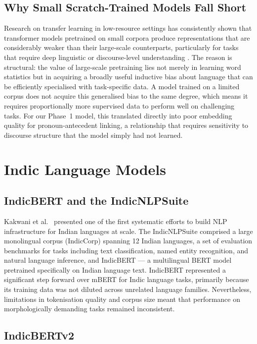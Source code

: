 \documentclass[12pt,a4paper]{report}
\begin{document}
\subsection{Why Small Scratch-Trained Models Fall Short}

Research on transfer learning in low-resource settings has consistently shown that transformer models pretrained on small corpora produce representations that are considerably weaker than their large-scale counterparts, particularly for tasks that require deep linguistic or discourse-level understanding \cite{lauscher2020zero}. The reason is structural: the value of large-scale pretraining lies not merely in learning word statistics but in acquiring a broadly useful inductive bias about language that can be efficiently specialised with task-specific data. A model trained on a limited corpus does not acquire this generalised bias to the same degree, which means it requires proportionally more supervised data to perform well on challenging tasks. For our Phase~1 model, this translated directly into poor embedding quality for pronoun-antecedent linking, a relationship that requires sensitivity to discourse structure that the model simply had not learned.

\section{Indic Language Models}

\subsection{IndicBERT and the IndicNLPSuite}

Kakwani et al.\ \cite{kakwani2020indicnlpsuite} presented one of the first systematic efforts to build NLP infrastructure for Indian languages at scale. The IndicNLPSuite comprised a large monolingual corpus (IndicCorp) spanning 12 Indian languages, a set of evaluation benchmarks for tasks including text classification, named entity recognition, and natural language inference, and IndicBERT --- a multilingual BERT model pretrained specifically on Indian language text. IndicBERT represented a significant step forward over mBERT for Indic language tasks, primarily because its training data was not diluted across unrelated language families. Nevertheless, limitations in tokenisation quality and corpus size meant that performance on morphologically demanding tasks remained inconsistent.

\subsection{IndicBERTv2}
\end{document}
